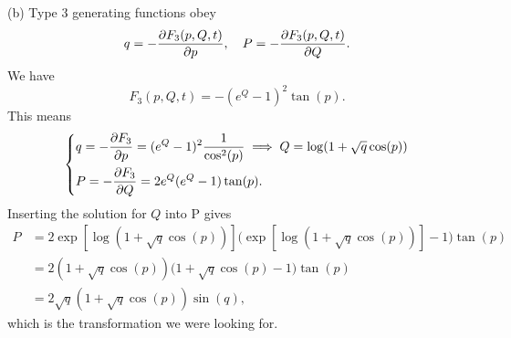 \documentclass{article}
\begin{document}
        (b) Type 3 generating functions obey
        \begin{equation*}
            q = - \pdv{F_3(p, Q, t)}{p}, \quad P = - \pdv{F_3(p, Q, t)}{Q}.
        \end{equation*}
        We have
        \begin{equation*}
            F_3(p, Q, t) = -(e^Q - 1)^2 \tan(p).
        \end{equation*}
        This means
        \begin{equation*}
            \begin{dcases*}
                q = - \pdv{F_3}{p} = (e^Q - 1)^2 \frac{1}{\cos^2(p)} \implies Q = \log(1 + \sqrt q \cos(p))\\
                P = - \pdv{F_3}{Q} = 2 e^Q(e^Q - 1) \tan(p).
            \end{dcases*}
        \end{equation*}
        Inserting the solution for $Q$ into P gives
        \begin{align*}
            P&= 2 \exp\left[\log(1 + \sqrt q \cos(p))\right]\Big(\exp\left[\log(1 + \sqrt q \cos(p))\right]  -1\Big)\tan(p)  \\
            & = 2(1 + \sqrt{q} \cos(p))\Big( 1 + \sqrt q \cos(p) - 1\Big)\tan(p) \\
            & = 2 \sqrt q (1 + \sqrt q \cos(p)) \sin(q),
        \end{align*}
        which is the transformation we were looking for.
\end{document}
